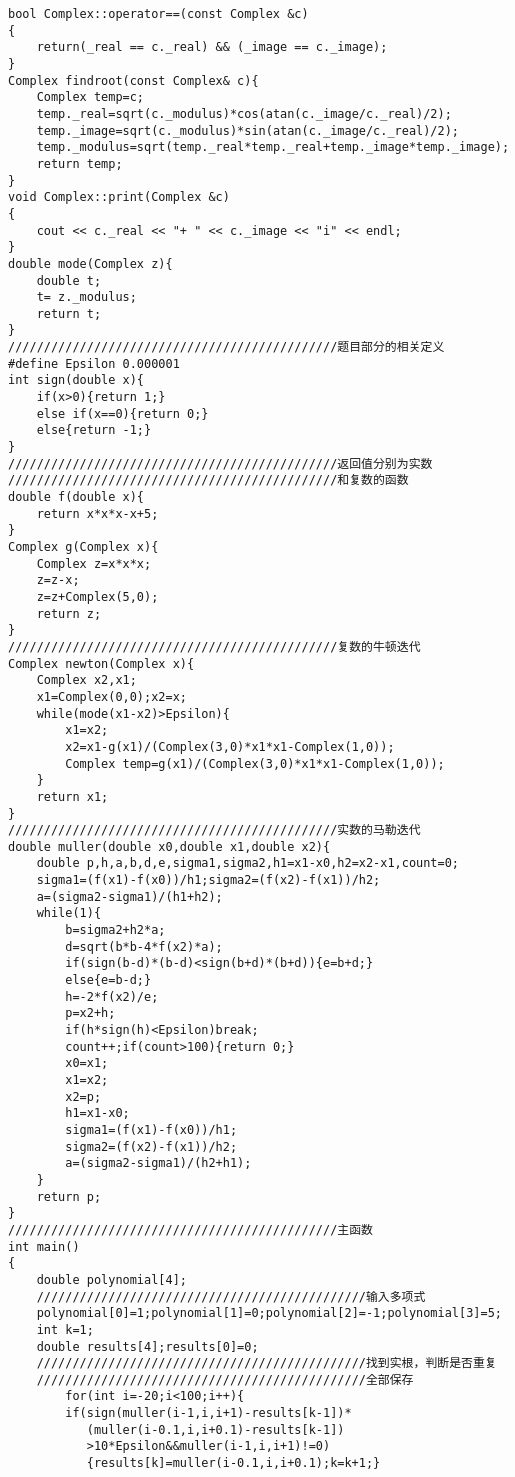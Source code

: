 \documentclass[a4paper,11pt,onecolumn,twoside]{article}
\begin{document}
\begin{appendices}
\begin{lstlisting}
bool Complex::operator==(const Complex &c)
{
    return(_real == c._real) && (_image == c._image);
}
Complex findroot(const Complex& c){
    Complex temp=c;
    temp._real=sqrt(c._modulus)*cos(atan(c._image/c._real)/2);
    temp._image=sqrt(c._modulus)*sin(atan(c._image/c._real)/2);
    temp._modulus=sqrt(temp._real*temp._real+temp._image*temp._image);
    return temp;
}
void Complex::print(Complex &c)
{
    cout << c._real << "+ " << c._image << "i" << endl;
}
double mode(Complex z){
    double t;
    t= z._modulus;
    return t;
}
//////////////////////////////////////////////题目部分的相关定义
#define Epsilon 0.000001
int sign(double x){
    if(x>0){return 1;}
    else if(x==0){return 0;}
    else{return -1;}
}
//////////////////////////////////////////////返回值分别为实数
//////////////////////////////////////////////和复数的函数
double f(double x){
    return x*x*x-x+5;
}
Complex g(Complex x){
    Complex z=x*x*x;
    z=z-x;
    z=z+Complex(5,0);
    return z;
}
//////////////////////////////////////////////复数的牛顿迭代
Complex newton(Complex x){
    Complex x2,x1;
    x1=Complex(0,0);x2=x;
    while(mode(x1-x2)>Epsilon){
        x1=x2;
        x2=x1-g(x1)/(Complex(3,0)*x1*x1-Complex(1,0));
        Complex temp=g(x1)/(Complex(3,0)*x1*x1-Complex(1,0));
    }
    return x1;
}
//////////////////////////////////////////////实数的马勒迭代
double muller(double x0,double x1,double x2){
    double p,h,a,b,d,e,sigma1,sigma2,h1=x1-x0,h2=x2-x1,count=0;
    sigma1=(f(x1)-f(x0))/h1;sigma2=(f(x2)-f(x1))/h2;
    a=(sigma2-sigma1)/(h1+h2);
    while(1){
        b=sigma2+h2*a;
        d=sqrt(b*b-4*f(x2)*a);
        if(sign(b-d)*(b-d)<sign(b+d)*(b+d)){e=b+d;}
        else{e=b-d;}
        h=-2*f(x2)/e;
        p=x2+h;
        if(h*sign(h)<Epsilon)break;
        count++;if(count>100){return 0;}
        x0=x1;
        x1=x2;
        x2=p;
        h1=x1-x0;
        sigma1=(f(x1)-f(x0))/h1;
        sigma2=(f(x2)-f(x1))/h2;
        a=(sigma2-sigma1)/(h2+h1);
    }
    return p;
}
//////////////////////////////////////////////主函数
int main()
{
    double polynomial[4];
    //////////////////////////////////////////////输入多项式
    polynomial[0]=1;polynomial[1]=0;polynomial[2]=-1;polynomial[3]=5;
    int k=1;
    double results[4];results[0]=0;
    //////////////////////////////////////////////找到实根，判断是否重复
    //////////////////////////////////////////////全部保存
        for(int i=-20;i<100;i++){
        if(sign(muller(i-1,i,i+1)-results[k-1])*
           (muller(i-0.1,i,i+0.1)-results[k-1])
           >10*Epsilon&&muller(i-1,i,i+1)!=0)
           {results[k]=muller(i-0.1,i,i+0.1);k=k+1;}

\end{lstlisting}
\end{appendices}
\end{document}
